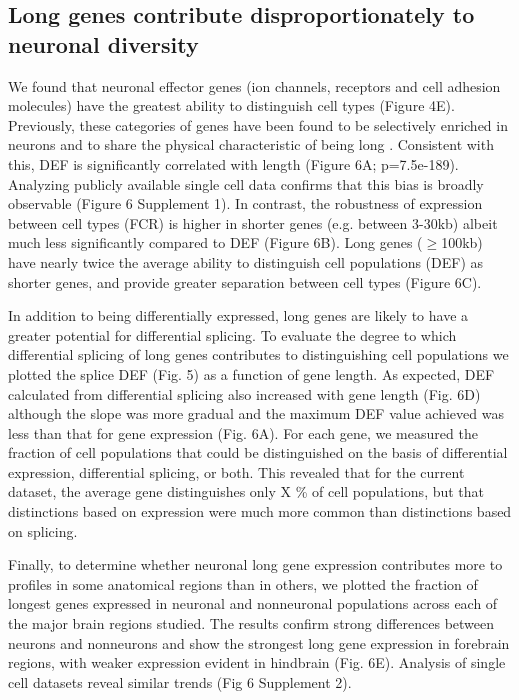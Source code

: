 \subsection{Long genes contribute disproportionately to neuronal diversity}

We found that neuronal effector genes (ion channels, receptors and cell adhesion molecules) have the greatest ability to distinguish cell types (Figure 4E). Previously, these categories of genes have been found to be selectively enriched in neurons and to share the physical characteristic of being long \citep{Sugino_2014,Gabel_2015,Zylka_2015}. Consistent with this, DEF is significantly correlated with length (Figure 6A; p=7.5e-189). Analyzing publicly available single cell data confirms that this bias is broadly observable (Figure 6 Supplement 1). In contrast, the robustness of expression between cell types (FCR) is higher in shorter genes (e.g. between 3-30kb) albeit much less significantly compared to DEF (Figure 6B). Long genes ($\geq$100kb) have nearly twice the average ability to distinguish cell populations (DEF) as shorter genes, and provide greater separation between cell types (Figure 6C).  

In addition to being differentially expressed, long genes are likely to have a greater potential for differential splicing. To evaluate the degree to which differential splicing of long genes contributes to distinguishing cell populations we plotted the splice DEF (Fig. 5) as a function of gene length. %
As expected, DEF calculated from differential splicing also increased with gene length (Fig. 6D) although the slope was more gradual and the maximum DEF value achieved was less than that for gene expression (Fig. 6A). For each gene, we measured the fraction of cell populations that could be distinguished on the basis of differential expression, differential splicing, or both. This revealed that for the current dataset, the average gene distinguishes only X \% of cell populations, but that distinctions based on expression were much more common than distinctions based on splicing.  

Finally, to determine whether neuronal long gene expression contributes more to profiles in some anatomical regions than in others, we plotted the fraction of longest genes expressed in neuronal and nonneuronal populations across each of the major brain regions studied. The results confirm strong differences between neurons and nonneurons and show the strongest long gene expression in forebrain regions, with weaker expression evident in hindbrain (Fig. 6E). Analysis of single cell datasets reveal similar trends (Fig 6 Supplement 2).

